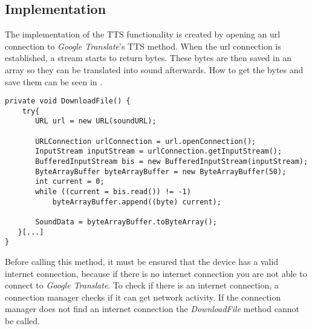 \subsection{Implementation}
The implementation of the TTS functionality is created by opening an url connection to \textit{Google Translate}'s TTS method.
When the url connection is established, a stream starts to return bytes.
These bytes are then saved in an array so they can be translated into sound afterwards.
How to get the bytes and save them can be seen in .

\begin{lstlisting}[caption={Download Sound event},label={lst:download-sound}]
private void DownloadFile() {
    try{
       URL url = new URL(soundURL);

       URLConnection urlConnection = url.openConnection();
       InputStream inputStream = urlConnection.getInputStream();
       BufferedInputStream bis = new BufferedInputStream(inputStream);
       ByteArrayBuffer byteArrayBuffer = new ByteArrayBuffer(50);
       int current = 0;
       while ((current = bis.read()) != -1)
           byteArrayBuffer.append((byte) current);

       SoundData = byteArrayBuffer.toByteArray();
   }[...]
}
\end{lstlisting} 

Before calling this method, it must be ensured that the device has a valid internet connection, because if there is no internet connection you are not able to connect to \textit{Google Translate}.
To check if there is an internet connection, a connection manager checks if it can get network activity.
If the connection manager does not find an internet connection the \textit{DownloadFile} method cannot be called.
